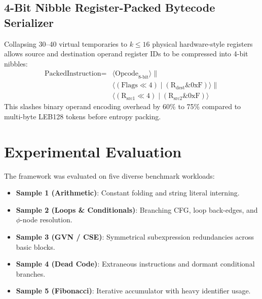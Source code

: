\documentclass{ieeeaccess}
\begin{document}
\subsection{4-Bit Nibble Register-Packed Bytecode Serializer}
Collapsing 30--40 virtual temporaries to $k \le 16$ physical hardware-style registers allows source and destination operand register IDs to be compressed into 4-bit nibbles:
\begin{equation}
\begin{aligned}
\text{PackedInstruction} ={}& \langle \text{Opcode}_{8\text{-bit}} \rangle \parallel \\
& \langle (\text{Flags} \ll 4) \mid (\text{R}_{\text{dest}} \mathrel{\&} 0\text{xF}) \rangle \parallel \\
& \langle (\text{R}_{\text{src1}} \ll 4) \mid (\text{R}_{\text{src2}} \mathrel{\&} 0\text{xF}) \rangle
\end{aligned}
\end{equation}
This slashes binary operand encoding overhead by 60\% to 75\% compared to multi-byte LEB128 tokens before entropy packing.

\section{Experimental Evaluation}
\label{sec:results} %

The framework was evaluated on five diverse benchmark workloads:
\begin{itemize}
    \item \textbf{Sample 1 (Arithmetic)}: Constant folding and string literal interning.
    \item \textbf{Sample 2 (Loops \& Conditionals)}: Branching CFG, loop back-edges, and $\phi$-node resolution.
    \item \textbf{Sample 3 (GVN / CSE)}: Symmetrical subexpression redundancies across basic blocks.
    \item \textbf{Sample 4 (Dead Code)}: Extraneous instructions and dormant conditional branches.
    \item \textbf{Sample 5 (Fibonacci)}: Iterative accumulator with heavy identifier usage.
\end{itemize}
\end{document}
